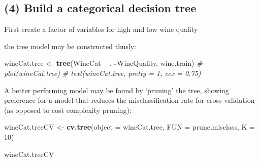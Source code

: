 \documentclass[12pt]{article}
\newenvironment{Shaded}{\begin{snugshade}}{\end{snugshade}}
\newcommand{\CommentTok}[1]{\textcolor[rgb]{0.56,0.35,0.01}{\textit{#1}}}
\newcommand{\DataTypeTok}[1]{\textcolor[rgb]{0.13,0.29,0.53}{#1}}
\newcommand{\DecValTok}[1]{\textcolor[rgb]{0.00,0.00,0.81}{#1}}
\newcommand{\KeywordTok}[1]{\textcolor[rgb]{0.13,0.29,0.53}{\textbf{#1}}}
\newcommand{\NormalTok}[1]{#1}
\newcommand{\OperatorTok}[1]{\textcolor[rgb]{0.81,0.36,0.00}{\textbf{#1}}}
\newcommand{\OtherTok}[1]{\textcolor[rgb]{0.56,0.35,0.01}{#1}}
\newcommand{\StringTok}[1]{\textcolor[rgb]{0.31,0.60,0.02}{#1}}
\begin{document}
\hypertarget{build-a-categorical-decision-tree}{%
\subsection{(4) Build a categorical decision
tree}\label{build-a-categorical-decision-tree}}

First create a factor of variables for high and low wine quality

\begin{Shaded}
\end{Shaded}

the tree model may be constructed thusly:

\begin{Shaded}
\begin{Highlighting}[]
\NormalTok{wineCat.tree <-}\StringTok{ }\KeywordTok{tree}\NormalTok{(WineCat }\OperatorTok{~}\StringTok{ }\NormalTok{. }\OperatorTok{-}\NormalTok{WineQuality, wine.train)}
\CommentTok{# plot(wineCat.tree)}
\CommentTok{# text(wineCat.tree, pretty = 1, cex = 0.75)}
\end{Highlighting}
\end{Shaded}

A better performing model may be found by `pruning' the tree, showing
preference for a model that reduces the misclassification rate for cross
validation (as opposed to cost complexity pruning):

\begin{Shaded}
\begin{Highlighting}[]
\NormalTok{wineCat.treeCV <-}\StringTok{ }\KeywordTok{cv.tree}\NormalTok{(}\DataTypeTok{object =}\NormalTok{ wineCat.tree, }\DataTypeTok{FUN =}\NormalTok{ prune.misclass, }\DataTypeTok{K =} \DecValTok{10}\NormalTok{)}

\NormalTok{wineCat.treeCV}
\end{Highlighting}
\end{Shaded}
\end{document}
